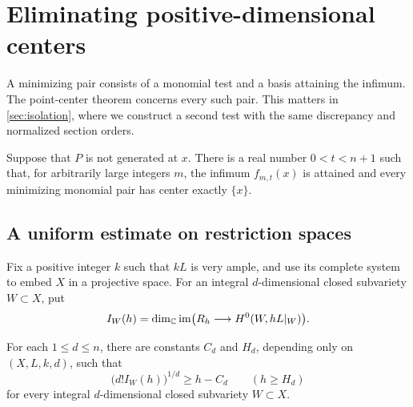 \section{Eliminating positive-dimensional centers}
\label{sec:centers}

A minimizing pair consists of a monomial test and a basis attaining the infimum. The point-center theorem concerns every such pair. This matters in \cref{sec:isolation}, where we construct a second test with the same discrepancy and normalized section orders.

\begin{proposition}\label{prop:point-center}
Suppose that $P$ is not generated at $x$. There is a real number $0<t<n+1$ such that, for arbitrarily large integers $m$, the infimum $f_{m,t}(x)$ is attained and every minimizing monomial pair has center exactly $\{x\}$.
\end{proposition}

\subsection{A uniform estimate on restriction spaces}

Fix a positive integer $k$ such that $kL$ is very ample, and use its complete system to embed $X$ in a projective space. For an integral $d$-dimensional closed subvariety $W\subset X$, put
\[
 I_W(h)=\dim_{\mathbb{C}}\operatorname{im}\bigl(R_h\longrightarrow H^0(W,hL|_W)\bigr).
\]

\begin{lemma}\label{lem:uniform-restrictions}
For each $1\le d\le n$, there are constants $C_d$ and $H_d$, depending only on $(X,L,k,d)$, such that
\begin{equation}\label{eq:uniform-restrictions}
 \bigl(d!I_W(h)\bigr)^{1/d}\ge h-C_d
 \qquad(h\ge H_d)
\end{equation}
for every integral $d$-dimensional closed subvariety $W\subset X$.
\end{lemma}

